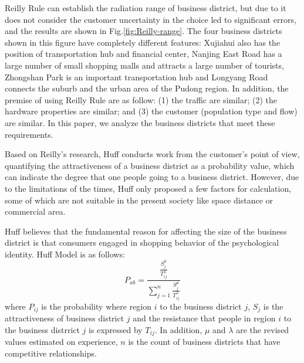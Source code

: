 \documentclass[journal]{IEEEtran}
\begin{document}
Reilly Rule can establish the radiation range of business district, but due to it does not consider the customer uncertainty in the choice led to significant errors, and the results are shown in Fig.\ref{fig:Reilly-range}. The four business districts shown in this figure have completely different features: Xujiahui also has the position of transportation hub and financial center, Nanjing East Road has a large number of small shopping malls and attracts a large number of tourists, Zhongshan Park is an important transportation hub and Longyang Road connects the suburb and the urban area of the Pudong region. In addition, the premise of using Reilly Rule are as follow: (1) the traffic are similar; (2) the hardware properties are similar; and (3) the customer (population type and flow) are similar. In this paper, we analyze the business districts that meet these requirements.

Based on Reilly's research, Huff conducts work from the customer's point of view, quantifying the attractiveness of a business district as a probability value, which can indicate the degree that one people going to a business district. However, due to the limitations of the times, Huff only proposed a few factors for calculation, some of which are not suitable in the present society like space distance or commercial area.

Huff believes that the fundamental reason for affecting the size of the business district is that consumers engaged in shopping behavior of the psychological identity. Huff Model is as follows:
\begin{equation}
P_{ab}=\frac{\frac{S_{j}^{\mu}}{T_{ij}^{\lambda}}}{\sum_{j=1}^{n}\frac{S_{j}^{\mu}}{T_{ij}^{\lambda}}}
\end{equation}
where $P_{ij}$ is the probability where region $i$ to the business district $j$, $S_{j}$ is the attractiveness of business district $j$ and the resistance that people in region $i$ to the business distrrict $j$ is expressed by $T_{ij}$. In addition, $\mu$ and $\lambda$ are the revised values estimated on experience, $n$ is the count of business districts that have competitive relationships.
\end{document}
